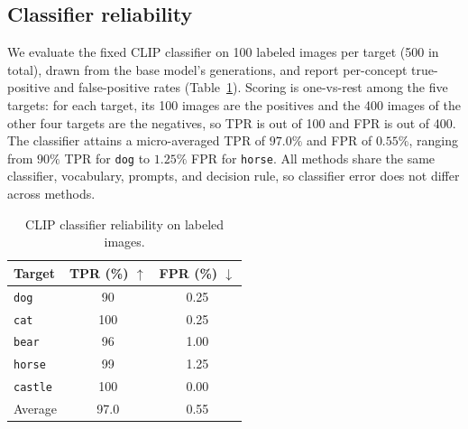 \subsection{Classifier reliability}\label{app:classifier}
We evaluate the fixed CLIP classifier on 100 labeled images per target (500 in
total), drawn from the base model's generations, and report per-concept true-positive and false-positive rates
(Table~\ref{tab:clf}). Scoring is one-vs-rest among the five targets: for each
target, its 100 images are the positives and the 400 images of the other four
targets are the negatives, so TPR is out of 100 and FPR is out of 400. The classifier attains a micro-averaged TPR of $97.0\%$
and FPR of $0.55\%$, ranging from $90\%$ TPR for \texttt{dog} to $1.25\%$ FPR
for \texttt{horse}. All methods share the same classifier, vocabulary, prompts,
and decision rule, so classifier error does not differ across methods.

\begin{table}[h]\centering\small
\caption{CLIP classifier reliability on labeled images.}\label{tab:clf}
\begin{tabular}{lcc}\toprule
Target & TPR (\%) $\uparrow$ & FPR (\%) $\downarrow$\\\midrule
\texttt{dog} & 90 & 0.25\\
\texttt{cat} & 100 & 0.25\\
\texttt{bear} & 96 & 1.00\\
\texttt{horse} & 99 & 1.25\\
\texttt{castle} & 100 & 0.00\\\midrule
Average & 97.0 & 0.55\\\bottomrule
\end{tabular}
\end{table}
